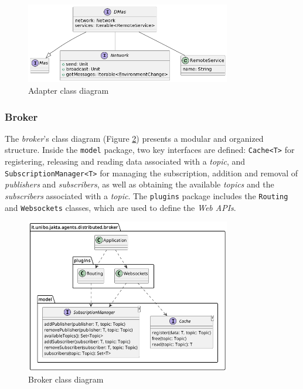 \begin{figure}[ht!]
    \centering
    \includegraphics[width=0.8\textwidth]{figures/class-dmas.png}
    \caption{Adapter class diagram}
    \label{fig:class-dmas}
\end{figure}

\subsubsection{Broker}

The \textit{broker}'s class diagram (Figure \ref{fig:broker-class-diagram}) presents a modular and organized structure.
Inside the \texttt{model} package, two key interfaces are defined: \texttt{Cache<T>} for registering, releasing and reading data associated with a \textit{topic}, and \texttt{SubscriptionManager<T>} for managing the subscription, addition and removal of \textit{publishers} and \textit{subscribers}, as well as obtaining the available \textit{topics} and the \textit{subscribers} associated with a \textit{topic}.
The \texttt{plugins} package includes the \texttt{Routing} and \texttt{Websockets} classes, which are used to define the \textit{Web APIs}.

\begin{figure}[ht!]
    \centering
    \includegraphics[width=0.8\textwidth]{figures/broker-class-diagram.png}
    \caption{Broker class diagram}
    \label{fig:broker-class-diagram}
\end{figure}

